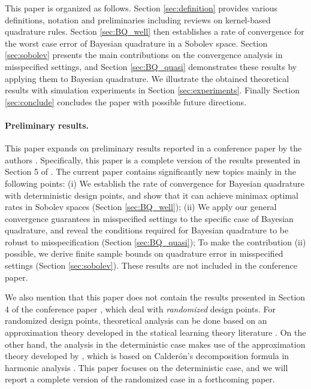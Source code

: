 \documentclass[11pt]{article}
\theoremstyle{remark}
\theoremstyle{example}
\theoremstyle{remark}
\newcommand{\citep}{\cite}
\begin{document}
This paper is organized as follows.
Section \ref{sec:definition} provides various definitions, notation and preliminaries including reviews on kernel-based quadrature rules.
Section \ref{sec:BQ_well} then establishes a rate of convergence for the worst case error of Bayesian quadrature in a Sobolev space.
Section \ref{sec:sobolev} presents the main contributions on the convergence analysis in misspecified settings, and Section \ref{sec:BQ_quasi} demonstrates these results by applying them to Bayesian quadrature. 
We illustrate the obtained theoretical results with simulation experiments in Section \ref{sec:experiments}.
Finally Section \ref{sec:conclude} concludes the paper with possible future directions.\vspace{-2mm}



\paragraph{Preliminary results.}
This paper expands on preliminary results reported in a conference paper by the authors \citep{KanSriFuk16}.
Specifically, this paper is a complete version of the results presented in Section 5 of \cite{KanSriFuk16}.
The current paper contains significantly new topics mainly in the following points:
(i) We establish the rate of convergence for Bayesian quadrature with deterministic design points, and show that it can achieve minimax optimal rates in Sobolev spaces (Section \ref{sec:BQ_well});
(ii) We apply our general convergence guarantees in misspecified settings to the specific case of Bayesian quadrature, and reveal the conditions required for Bayesian quadrature to be robust to misspecification (Section \ref{sec:BQ_quasi});
To make the contribution (ii) possible, we derive finite sample bounds on quadrature error in misspecified settings (Section \ref{sec:sobolev}).
These results are not included in the conference paper.

We also mention that this paper does not contain the results presented in Section 4 of the conference paper \cite{KanSriFuk16}, which deal with {\em randomized} design points. 
For randomized design points, theoretical analysis can be done based on an approximation theory developed in the statical learning theory literature \citep{CucZho07}. 
On the other hand, the analysis in the deterministic case makes use of the approximation theory developed by \cite{NarWar04}, which is based on Calder\'on's decomposition formula in harmonic analysis \citep{FraJawWei91}.
This paper focuses on the deterministic case, and we will report a complete version of the randomized case in a forthcoming paper.\vspace{-3mm}
\end{document}
